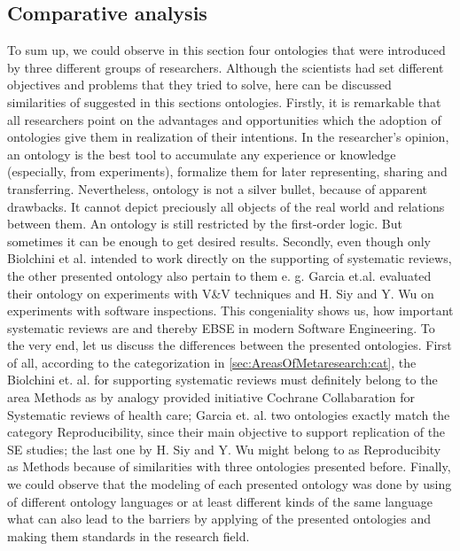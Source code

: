 	\subsection{Comparative analysis}
	To sum up, we could observe in this section four ontologies that were introduced by three different groups of researchers. Although the scientists had set different objectives and problems that they tried to solve, here can be discussed similarities of suggested in this sections ontologies. Firstly, it is remarkable that all researchers point on the advantages and opportunities which the adoption of ontologies give them in realization of their intentions. In the researcher's opinion, an ontology is the best tool to accumulate any experience or knowledge (especially, from experiments), formalize them for later representing, sharing and transferring. Nevertheless, ontology is not a silver bullet, because of apparent drawbacks. It cannot depict preciously all objects of the real world and relations between them. An ontology is still restricted by the first-order logic. But sometimes it can be enough to get desired results. Secondly, even though only Biolchini et al.\cite{Bio07} intended to work directly on the supporting of systematic reviews, the other presented ontology also pertain to them e. g. Garcia et.al.\cite{Gar08} evaluated their ontology on experiments with V\&V techniques\cite{Bas87} and H. Siy and Y. Wu \cite{SiyWu12} on experiments with software inspections\cite{Bas99}. This congeniality shows us, how important systematic reviews are and thereby EBSE in modern Software Engineering.\newline
	To the very end, let us discuss the differences between the presented ontologies. First of all, according to the categorization in \autoref{sec:AreasOfMetaresearch:cat}, the Biolchini et. al. for supporting systematic reviews\cite{Bio07} must definitely belong to the area Methods as by analogy provided initiative Cochrane Collabaration for Systematic reviews of health care; Garcia et. al. two ontologies\cite{Gar08}\cite{Gar11} exactly match the category Reproducibility, since their main objective to support replication of the SE studies; the last one by H. Siy and Y. Wu\cite{SiyWu12} might belong to as Reproducibity as Methods because of similarities with three ontologies presented before. Finally, we could observe that the modeling of each presented ontology was done by using of different ontology languages or at least different kinds of the same language what can also lead to the barriers by applying of the presented ontologies and making them standards in the research field.
	  	 
